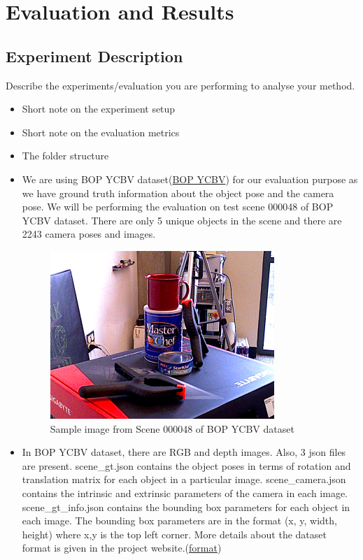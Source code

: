 \documentclass[report.tex]{subfiles}
\begin{document}
    \chapter{Evaluation and Results}

    \section{Experiment Description}

    Describe the experiments/evaluation you are performing to analyse your method.
    \begin{itemize}
        \item Short note on the experiment setup
        \item Short note on the evaluation metrics
        \item The folder structure
    \end{itemize}
        \begin{itemize}
    \item We are using BOP YCBV dataset(\href{https://bop.felk.cvut.cz/datasets/}{BOP YCBV}) for our evaluation purpose as we have ground truth information about the object pose and the camera pose. We will be performing the evaluation on test scene 000048 of BOP YCBV dataset. There are only 5 unique objects in the scene and there are 2243 camera poses and images.
    
\begin{figure}[H]
\centering
\includegraphics[width=0.8\textwidth] {Images/scene48.png}
\caption{\centering Sample image from Scene 000048 of BOP YCBV dataset}
\label{fig:scene48}
\end{figure}

    \item In BOP YCBV dataset, there are RGB and depth images. Also, 3 json files are present. scene\_gt.json contains the object poses in terms of rotation and translation matrix for each object in a particular image. scene\_camera.json contains the intrinsic and extrinsic parameters of the camera in each image. scene\_gt\_info.json contains the bounding box parameters for each object in each image. The bounding box parameters are in the format (x, y, width, height) where x,y is the top left corner. More details about the dataset format is given in the project website.(\href{https://github.com/thodan/bop\_toolkit/blob/master/docs/bop\_datasets\_format.md}{format})
\end{itemize}
\end{document}
